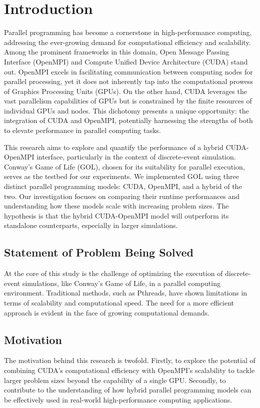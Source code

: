 \documentclass[11pt,twocolumn]{article}
\begin{document}
\section{Introduction}

Parallel programming has become a cornerstone in high-performance computing, addressing the ever-growing demand for computational efficiency and scalability. Among the prominent frameworks in this domain, Open Message Passing Interface (OpenMPI) and Compute Unified Device Architecture (CUDA) stand out. OpenMPI excels in facilitating communication between computing nodes for parallel processing, yet it does not inherently tap into the computational prowess of Graphics Processing Units (GPUs). On the other hand, CUDA leverages the vast parallelism capabilities of GPUs but is constrained by the finite resources of individual GPUs and nodes. This dichotomy presents a unique opportunity: the integration of CUDA and OpenMPI, potentially harnessing the strengths of both to elevate performance in parallel computing tasks.

This research aims to explore and quantify the performance of a hybrid CUDA-OpenMPI interface, particularly in the context of discrete-event simulation. Conway's Game of Life (GOL), chosen for its suitability for parallel execution, serves as the testbed for our experiments. We implemented GOL using three distinct parallel programming models: CUDA, OpenMPI, and a hybrid of the two. Our investigation focuses on comparing their runtime performances and understanding how these models scale with increasing problem sizes. The hypothesis is that the hybrid CUDA-OpenMPI model will outperform its standalone counterparts, especially in larger simulations.

\subsection*{Statement of Problem Being Solved}
At the core of this study is the challenge of optimizing the execution of discrete-event simulations, like Conway's Game of Life, in a parallel computing environment. Traditional methods, such as Pthreads, have shown limitations in terms of scalability and computational speed. The need for a more efficient approach is evident in the face of growing computational demands.

\subsection*{Motivation}
The motivation behind this research is twofold. Firstly, to explore the potential of combining CUDA's computational efficiency with OpenMPI's scalability to tackle larger problem sizes beyond the capability of a single GPU. Secondly, to contribute to the understanding of how hybrid parallel programming models can be effectively used in real-world high-performance computing applications.
\end{document}
